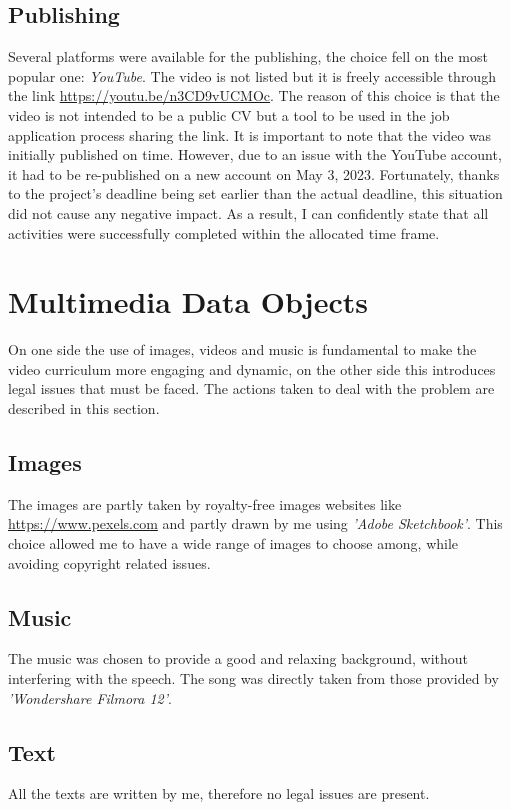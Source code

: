 \documentclass{article}
\begin{document}
\begin{multicols}{2}
    \subsection{Publishing}
    Several platforms were available for the publishing, the choice fell on the most popular one: \textit{YouTube}. The video is not listed but it is freely accessible through the link \url{https://youtu.be/n3CD9vUCMOc}.
    The reason of this choice is that the video is not intended to be a public CV but a tool to be used in the job application process sharing the link. It is important to note that the video was initially published on 
    time. However, due to an issue with the YouTube account, it had to be re-published on a new account on May 3, 2023. Fortunately, thanks to the project's deadline being set earlier than the actual deadline, 
    this situation did not cause any negative impact. As a result, I can confidently state that all activities were successfully completed within the allocated time frame.


\section{Multimedia Data Objects}
On one side the use of images, videos and music is fundamental to make the video curriculum more engaging and dynamic, on the other side this introduces legal issues that must be faced.
The actions taken to deal with the problem are described in this section.

    \subsection{Images}
    The images are partly taken by royalty-free images websites like \url{https://www.pexels.com} and partly drawn by me using \textit{'Adobe Sketchbook'}. This choice allowed me to
    have a wide range of images to choose among, while avoiding copyright related issues.

    \subsection{Music}
    The music was chosen to provide a good and relaxing background, without interfering with the speech. The song was directly taken from those provided by \textit{'Wondershare Filmora 12'}.

    \subsection{Text}
    All the texts are written by me, therefore no legal issues are present.



\end{multicols}
\end{document}
